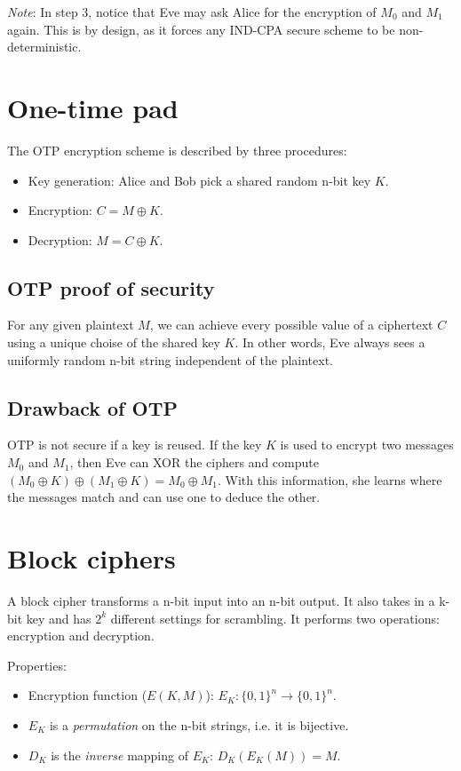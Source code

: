 \emph{Note}: In step 3, notice that Eve may ask Alice for the encryption of $M_0$ and $M_1$ again. This is by design, as it forces any IND-CPA secure scheme to be non-deterministic.

\section{One-time pad}
The OTP encryption scheme is described by three procedures:
\begin{itemize}
    \item Key generation: Alice and Bob pick a shared random n-bit key $K$.
    \item Encryption: $C = M \oplus K$.
    \item Decryption: $M = C \oplus K$.
\end{itemize}

\subsection{OTP proof of security}
For any given plaintext $M$, we can achieve every possible value of a ciphertext $C$ using a unique choise of the shared key $K$. In other words, Eve always sees a uniformly random n-bit string independent of the plaintext.

\subsection{Drawback of OTP}
OTP is not secure if a key is reused. If the key $K$ is used to encrypt two messages $M_0$ and $M_1$, then Eve can XOR the ciphers and compute $(M_0 \oplus K) \oplus (M_1 \oplus K) = M_0 \oplus M_1$. With this information, she learns where the messages match and can use one to deduce the other.

\section{Block ciphers}
A block cipher transforms a n-bit input into an n-bit output. It also takes in a k-bit key and has $2^k$ different settings for scrambling. It performs two operations: encryption and decryption.

\medskip

Properties:
\begin{itemize}
    \item Encryption function ($E(K, M)$): \(E_K: \{0, 1\}^n \rightarrow \{0, 1\}^n\).
    \item $E_K$ is a \emph{permutation} on the n-bit strings, i.e. it is bijective.
    \item $D_K$ is the \emph{inverse} mapping of $E_K$: $D_K(E_K(M)) = M$.
\end{itemize}


